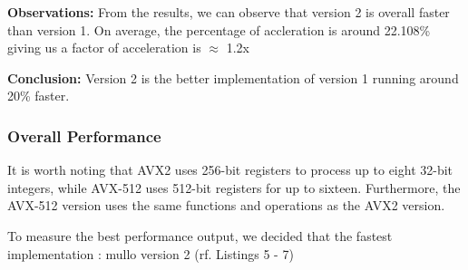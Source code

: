 \documentclass{article}
\begin{document}
\textbf{Observations:}
From the results, we can observe that version 2 is overall faster than version 1. On average, the percentage of accleration is 
around 22.108\% giving us a factor of acceleration is $\approx$ 1.2x

\textbf{Conclusion:}
Version 2 is the better implementation of version 1 running around 20\% faster.
\subsubsection{Overall Performance}
It is worth noting that AVX2 uses 256-bit registers to process up to eight 32-bit integers, while AVX-512 uses 512-bit registers for up to sixteen. Furthermore, the AVX-512 version uses the same functions and operations as the AVX2 version.

To measure the best performance output, we decided that the fastest implementation : mullo version 2 (rf. Listings 5 - 7) 
\end{document}
